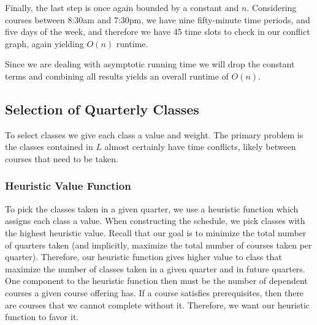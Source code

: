 \documentclass[11pt]{article} %
\begin{document}
Finally, the last step is once again bounded by a constant and $n$. Considering
courses between 8:30am and 7:30pm, we have nine fifty-minute time periods, and
five days of the week, and therefore we have 45 time slots to check in our
conflict graph, again yielding $O(n)$ runtime.

Since we are dealing with asymptotic running time we will drop the constant
terms and combining all results yields an overall runtime of $O(n)$.

\subsection{Selection of Quarterly Classes} To select classes we give each class
a value and weight. The primary problem is the classes contained in $L$
almost certainly have time conflicts, likely between courses that need to be
taken. 

\subsubsection{Heuristic Value Function} To pick the classes taken in a given quarter,
we use a heuristic function which assigns
each class a value. When constructing the schedule, we pick classes with the highest heuristic value.
Recall that our goal is to
minimize the total number of quarters taken (and implicitly, maximize the total
number of courses taken per quarter). Therefore, our heuristic function gives higher
value to class that maximize the number of classes taken in a given quarter and in
future quarters.  One component to the heuristic function then must be the
number of dependent courses a given course offering has. If a course satisfies
prerequisites, then there are courses that we cannot
complete without it. Therefore, we want our heuristic function to favor it.
\end{document}
